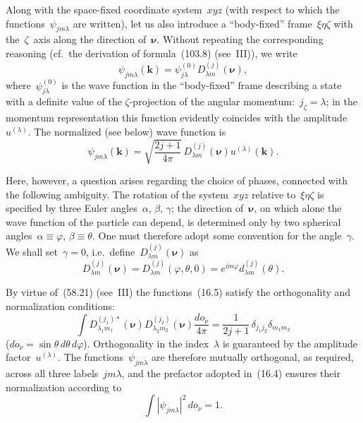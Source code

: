 Along with the space-fixed coordinate system~$xyz$ (with respect to which the functions~$\psi_{jm\lambda}$ are written), let us also introduce a ``body-fixed'' frame~$\xi\eta\zeta$ with the~$\zeta$~axis along the direction of~$\boldsymbol{\nu}$. Without repeating the corresponding reasoning (cf.\ the derivation of formula~(103.8) (see~III)), we write
\[
\psi_{jm\lambda}(\mathbf{k}) = \psi^{(0)}_{j\lambda}D^{(j)}_{\lambda m}(\boldsymbol{\nu}),
\]
where~$\psi^{(0)}_{j\lambda}$ is the wave function in the ``body-fixed'' frame describing a state with a definite value of the $\zeta$-projection of the angular momentum:~$j_\zeta = \lambda$; in the momentum representation this function evidently coincides with the amplitude~$u^{(\lambda)}$. The normalized (see below) wave function is
\begin{equation}
\psi_{jm\lambda}(\mathbf{k}) = \sqrt{\frac{2j+1}{4\pi}}\,D^{(j)}_{\lambda m}(\boldsymbol{\nu})u^{(\lambda)}(\mathbf{k}).
\tag{16.4}
\end{equation}

Here, however, a question arises regarding the choice of phases, connected with the following ambiguity. The rotation of the system~$xyz$ relative to~$\xi\eta\zeta$ is specified by three Euler angles~$\alpha$, $\beta$, $\gamma$; the direction of~$\boldsymbol{\nu}$, on which alone the wave function of the particle can depend, is determined only by two spherical angles~$\alpha \equiv \varphi$, $\beta \equiv \theta$. One must therefore adopt some convention for the angle~$\gamma$. We shall set~$\gamma = 0$, i.e.\ define~$D^{(j)}_{\lambda m}(\boldsymbol{\nu})$ as
\begin{equation}
D^{(j)}_{\lambda m}(\boldsymbol{\nu}) = D^{(j)}_{\lambda m}(\varphi, \theta, 0) = e^{im\varphi}d^{(j)}_{\lambda m}(\theta).
\tag{16.5}
\end{equation}

By virtue of~(58.21) (see~III) the functions~(16.5) satisfy the orthogonality and normalization conditions:
\begin{equation}
\int D^{(j_1)*}_{\lambda_1 m_1}(\boldsymbol{\nu})D^{(j_2)}_{\lambda_2 m_2}(\boldsymbol{\nu})\frac{do_\nu}{4\pi} = \frac{1}{2j+1}\,\delta_{j_1 j_2}\delta_{m_1 m_2}
\tag{16.6}
\end{equation}
($do_\nu = \sin\theta\,d\theta\,d\varphi$). Orthogonality in the index~$\lambda$ is guaranteed by the amplitude factor~$u^{(\lambda)}$. The functions~$\psi_{jm\lambda}$ are therefore mutually orthogonal, as required, across all three labels~$jm\lambda$, and the prefactor adopted in~(16.4) ensures their normalization according to
\begin{equation}
\int|\psi_{jm\lambda}|^2\,do_\nu = 1.
\tag{16.7}
\end{equation}

